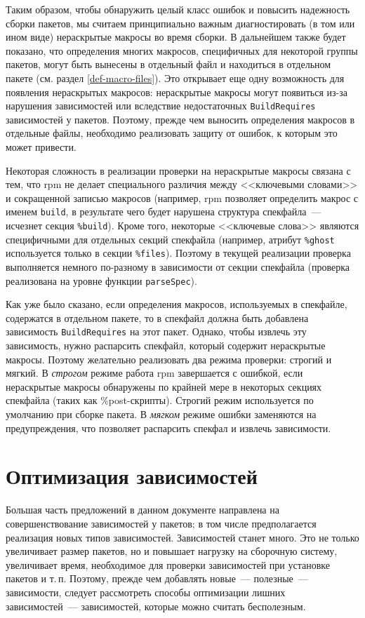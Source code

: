 \documentclass[russian,a4paper,12pt,titlepage]{article}
\begin{document}
Таким образом, чтобы обнаружить целый класс ошибок и повысить надежность сборки пакетов, мы считаем принципиально
важным диагностировать (в том или ином виде) нераскрытые макросы во время сборки.  В дальнейшем также будет показано, что
определения многих макросов, специфичных для некоторой группы пакетов, могут быть вынесены в отдельный файл и находиться
в отдельном пакете (см. раздел \ref{def-macro-files}).  Это открывает еще одну возможность для появления нераскрытых
макросов: нераскрытые макросы могут появиться из-за нарушения зависимостей или вследствие недостаточных \verb|BuildRequires|
зависимостей у пакетов.  Поэтому, прежде чем выносить определения макросов в отдельные файлы, необходимо реализовать защиту от ошибок,
к которым это может привести.

Некоторая сложность в реализации проверки на нераскрытые макросы связана с тем, что rpm не делает специального различия
между <<ключевыми словами>> и сокращенной записью макросов (например, rpm позволяет определить макрос с именем \verb|build|,
в результате чего будет нарушена структура спекфайла~--- исчезнет секция \verb|%build|).  Кроме того, некоторые <<ключевые слова>>
являются специфичными для отдельных секций спекфайла (например, атрибут \verb|%ghost| используется только в секции \verb|%files|).
Поэтому в текущей реализации проверка выполняется немного по-разному в зависимости от секции спекфайла (проверка реализована
на уровне функции \verb|parseSpec|).

Как уже было сказано, если определения макросов, используемых в спекфайле, содержатся в отдельном пакете,
то в спекфайл должна быть добавлена зависимость \verb|BuildRequires| на этот пакет.  Однако, чтобы извлечь эту зависимость,
нужно распарсить спекфайл, который содержит нераскрытые макросы.  Поэтому желательно реализовать два режима
проверки: строгий и мягкий.  В \textit{строгом} режиме работа rpm завершается с ошибкой, если нераскрытые макросы обнаружены
по крайней мере в некоторых секциях спекфайла (таких как \%post-скрипты).  Строгий режим используется по умолчанию при сборке пакета.
В \textit{мягком} режиме ошибки заменяются на предупреждения, что позволяет распарсить спекфал и извлечь зависимости.

\section{Оптимизация зависимостей}
\label{deps-optimization}
Большая часть предложений в данном документе направлена на совершенствование зависимостей у пакетов;
в том числе предполагается реализация новых типов зависимостей.  Зависимостей станет много.  Это не только
увеличивает размер пакетов, но и повышает нагрузку на сборочную систему, увеличивает время, необходимое
для проверки зависимостей при установке пакетов и т.\,п.  Поэтому, прежде чем добавлять новые~--- полезные~---
зависимости, следует рассмотреть способы оптимизации лишних зависимостей~--- зависимостей, которые можно
считать бесполезным.
\end{document}
